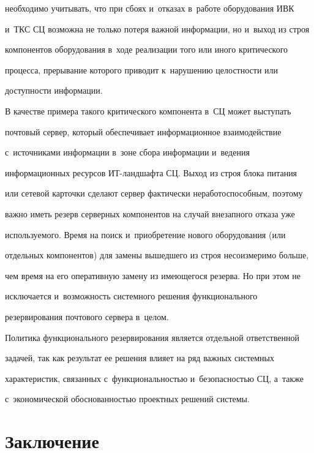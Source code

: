 необходимо учитывать, что при сбоях и~отказах в~работе оборудования ИВК 

и~ТКС СЦ возможна не только потеря важной информации, но и~выход из строя 

компонентов оборудования в~ходе реализации того или иного критического 

процесса, прерывание которого приводит к~нарушению целостности или 

доступности информации. 

  {



}



  В качестве примера такого критического компонента в~СЦ может выступать 

почтовый сервер, который обеспечивает информационное взаимодействие 

с~источниками информации в~зоне сбора информации и~ведения 

информационных ресурсов ИТ-ланд\-шаф\-та СЦ. Выход из строя блока питания 

или сетевой карточки сделают сервер фактически неработоспособным, поэтому 

важно иметь резерв серверных компонентов на случай внезапного отказа уже 

используемого. Время на поиск и~приобретение нового оборудования (или 

отдельных компонентов) для замены вышедшего из строя несоизмеримо больше, 

чем время на его оперативную замену из имеющегося резерва. Но при этом не 

исключается и~возможность сис\-тем\-но\-го решения функционального 

резервирования почтового сервера в~целом. 

  

  Политика функционального резервирования является отдельной ответственной 

задачей, так как результат ее решения влияет на ряд важных сис\-тем\-ных 

характеристик, связанных с~функциональностью и~безопасностью СЦ, а~также 

с~экономической обоснованностью проектных решений системы. 

  

\section{Заключение}



